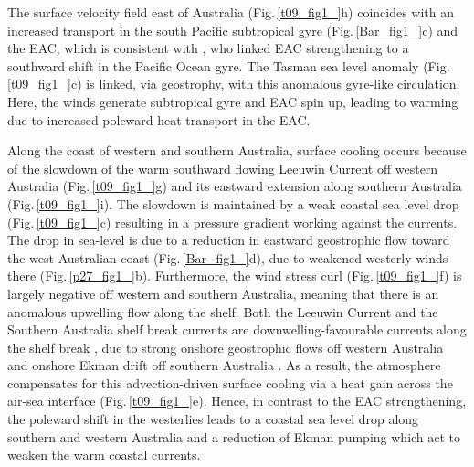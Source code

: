 \documentclass[draft,linenumbers]{agujournal2018}
\begin{document}
The surface velocity field east of Australia (Fig.\,\ref{t09_fig1_}h) coincides with an increased transport in the south Pacific subtropical gyre (Fig.\,\ref{Bar_fig1_}c) and the EAC, which is consistent with \citet{Hill2011}, who linked EAC strengthening to a southward shift in the Pacific Ocean gyre. The Tasman sea level anomaly (Fig.\,\ref{t09_fig1_}c) is linked, via geostrophy, with this anomalous gyre-like circulation. Here, the winds generate subtropical gyre and EAC spin up, leading to warming due to increased poleward heat transport in the EAC.

Along the coast of western and southern Australia, surface cooling occurs because of the slowdown of the warm southward flowing Leeuwin Current off western Australia (Fig.\,\ref{t09_fig1_}g) and its eastward extension along southern Australia (Fig.\,\ref{t09_fig1_}i). The slowdown is maintained by a weak coastal sea level drop (Fig.\,\ref{t09_fig1_}c) resulting in a pressure gradient working against the currents. The drop in sea-level is due to a reduction in eastward geostrophic flow toward the west Australian coast (Fig.\,\ref{Bar_fig1_}d), due to weakened westerly winds there (Fig.\,\ref{p27_fig1_}b). Furthermore, the wind stress curl (Fig.\,\ref{t09_fig1_}f) is largely negative off western and southern Australia, meaning that there is an anomalous upwelling flow along the shelf. Both the Leeuwin Current and the Southern Australia shelf break currents are downwelling-favourable currents along the shelf break \citep{Furue2017,Middleton2007}, due to strong onshore geostrophic flows off western Australia \citep{Godfrey1985} and onshore Ekman drift off southern Australia \citep{Middleton2007}. As a result, the atmosphere compensates for this advection-driven surface cooling via a heat gain across the air-sea interface (Fig.\,\ref{t09_fig1_}e). Hence, in contrast to the EAC strengthening, the poleward shift in the westerlies leads to a coastal sea level drop along southern and western Australia and a reduction of Ekman pumping which act to weaken the warm coastal currents.
\end{document}
